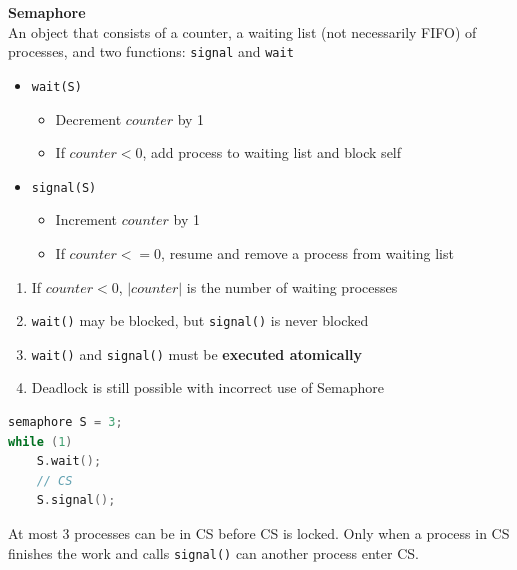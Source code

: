 \documentclass[a4paper, 12pt]{article}
\begin{document}
\begin{multicols*}{3}
\textbf{Semaphore} \\
An object that consists of a counter, a waiting list (not necessarily FIFO) of processes, and two functions: \texttt{signal} and \texttt{wait}
\begin{itemize}
	\item \texttt{wait(S)}
	\begin{itemize}
		\item Decrement $counter$ by 1
		\item If $counter < 0$, add process to waiting list and block self
	\end{itemize}
	\item \texttt{signal(S)}
	\begin{itemize}
		\item Increment $counter$ by 1
		\item If $counter <= 0$, resume and remove a process from waiting list
	\end{itemize}
\end{itemize}
\begin{enumerate}
	\item If $counter < 0$, $|counter|$ is the number of waiting processes
	\item \texttt{wait()} may be blocked, but \texttt{signal()} is never blocked
	\item \texttt{wait()} and \texttt{signal()} must be \textbf{executed atomically}
	\item Deadlock is still possible with incorrect use of Semaphore
\end{enumerate}

\setlength{\columnsep}{-2cm}
\begin{multicols}{2}
\noindent
\begin{lstlisting}[language=C]
semaphore S = 3;
while (1)
    S.wait();
    // CS
    S.signal();
\end{lstlisting}
\vfill\null
\columnbreak
At most 3 processes can be in CS before CS is locked. Only when a process in CS finishes the work and calls \texttt{signal()} can another process enter CS.
\end{multicols}

\newpage


\end{multicols*}
\end{document}
